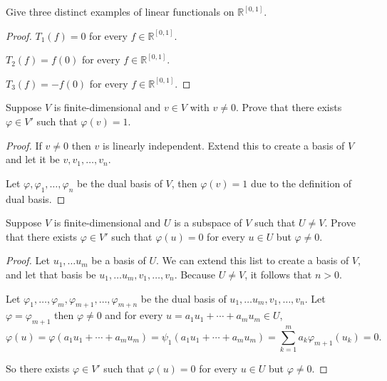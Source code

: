 \begin{exercise}
    Give three distinct examples of linear functionals on $\mathbb{R}^{[0, 1]}$.
\end{exercise}

\begin{proof}
    $T_{1}(f) = 0$ for every $f\in \mathbb{R}^{[0, 1]}$.

    $T_{2}(f) = f(0)$ for every $f\in \mathbb{R}^{[0, 1]}$.

    $T_{3}(f) = -f(0)$ for every $f\in \mathbb{R}^{[0, 1]}$.
\end{proof}
\newpage

\begin{exercise}
    Suppose $V$ is finite-dimensional and $v \in V$ with $v \ne 0$. Prove that there exists $\varphi\in V'$ such that $\varphi(v) = 1$.
\end{exercise}

\begin{proof}
    If $v\ne 0$ then $v$ is linearly independent. Extend this to create a basis of $V$ and let it be $v, v_{1}, \ldots, v_{n}$.

    Let $\varphi, \varphi_{1}, \ldots, \varphi_{n}$ be the dual basis of $V$, then $\varphi(v) = 1$ due to the definition of dual basis.
\end{proof}
\newpage

\begin{exercise}
    Suppose $V$ is finite-dimensional and $U$ is a subspace of $V$ such that $U \ne V$. Prove that there exists $\varphi\in V'$ such that $\varphi(u) = 0$ for every $u\in U$ but $\varphi \ne 0$.
\end{exercise}

\begin{proof}
    Let $u_{1}, \ldots u_{m}$ be a basis of $U$. We can extend this list to create a basis of $V$, and let that basis be $u_{1}, \ldots u_{m}, v_{1}, \ldots, v_{n}$. Because $U\ne V$, it follows that $n > 0$.

    Let $\varphi_{1}, \ldots, \varphi_{m}, \varphi_{m+1}, \ldots, \varphi_{m+n}$ be the dual basis of $u_{1}, \ldots u_{m}, v_{1}, \ldots, v_{n}$. Let $\varphi = \varphi_{m+1}$ then $\varphi\ne 0$ and for every $u = a_{1}u_{1} + \cdots + a_{m}u_{m}\in U$,
    \[
        \varphi(u) = \varphi(a_{1}u_{1} + \cdots + a_{m}u_{m}) = \psi_{1}(a_{1}u_{1} + \cdots + a_{m}u_{m}) = \sum^{m}_{k=1}a_{k}\varphi_{m+1}(u_{k}) = 0.
    \]

    So there exists $\varphi\in V'$ such that $\varphi(u) = 0$ for every $u\in U$ but $\varphi\ne 0$.
\end{proof}
\newpage

